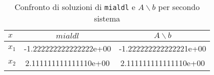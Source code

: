 \begin{table}[ht]
   \centering
   \renewcommand\arraystretch{2}
   \begin{tabular}{| l | c c |}
      \hline
      $x$     & $mialdl$               & $A \backslash b$       \\
      \hline
      $x_{1}$ & -1.222222222222222e+00 & -1.222222222222221e+00 \\
      $x_{2}$ & 2.111111111111110e+00  & 2.111111111111110e+00  \\
      \hline
   \end{tabular}
   \caption{Confronto di soluzioni di \lstinline{mialdl} e $A \backslash b$ per secondo sistema}
   \label{tab:9_2}
\end{table}
\FloatBarrier
